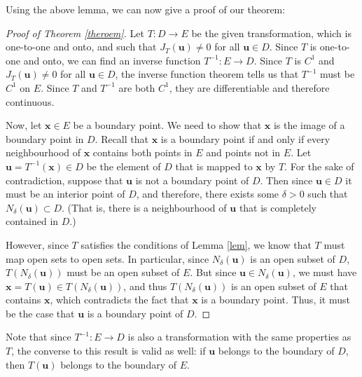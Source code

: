 \documentclass[12pt,letterpaper]{article}
\newcommand{\x}{\mathbf{x}}
\newcommand{\uu}{\mathbf{u}}
\begin{document}
Using the above lemma, we can now give a proof of our theorem:
\begin{proof}[Proof of Theorem \ref{theroem}]
Let $T:D\to E$ be the given transformation, which is one-to-one and onto, and such that $J_T(\uu)\neq 0$ for all $\uu\in D$. Since $T$ is one-to-one and onto, we can find an inverse function $T^{-1}:E\to D$. Since $T$ is $C^1$ and $J_T(\uu)\neq 0$ for all $\uu\in D$, the inverse function theorem tells us that $T^{-1}$ must be $C^1$ on $E$. Since $T$ and $T^{-1}$ are both $C^1$, they are differentiable and therefore continuous.

Now, let $\x\in E$ be a boundary point. We need to show that $\x$ is the image of a boundary point in $D$. Recall that $\x$ is a boundary point if and only if every neighbourhood of $\x$ contains both points in $E$ and points not in $E$. Let $\uu=T^{-1}(\x)\in D$ be the element of $D$ that is mapped to $\x$ by $T$. For the sake of contradiction, suppose that $\uu$ is not a boundary point of $D$. Then since $\uu\in D$ it must be an interior point of $D$, and therefore, there exists some $\delta>0$ such that $N_\delta(\uu)\subset D$. (That is, there is a neighbourhood of $\uu$ that is completely contained in $D$.)

However, since $T$ satisfies the conditions of Lemma \ref{lem}, we know that $T$ must map open sets to open sets. In particular, since $N_\delta(\uu)$ is an open subset of $D$, $T(N_\delta(\uu))$ must be an open subset of $E$. But since $\uu\in N_\delta(\uu)$, we must have $\x = T(\uu)\in T(N_\delta(\uu))$, and thus $T(N_\delta(\uu))$ is an open subset of $E$ that contains $\x$, which contradicts the fact that $\x$ is a boundary point. Thus, it must be the case that $\uu$ is a boundary point of $D$.
\end{proof}
Note that since $T^{-1}:E\to D$ is also a transformation with the same properties as $T$, the converse to this result is valid as well: if $\uu$ belongs to the boundary of $D$, then $T(\uu)$ belongs to the boundary of $E$.
\end{document}
